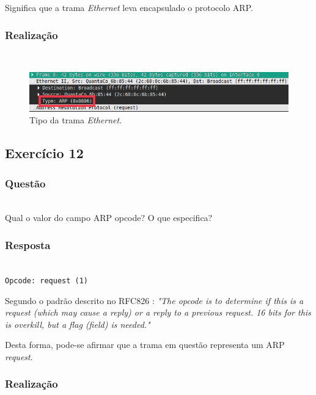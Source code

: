 \documentclass{llncs}
\begin{document}
Significa que a trama \textit{Ethernet} leva encapsulado o protocolo ARP.

\subsubsection{Realização}\rule[-10pt]{0pt}{10pt}\\

\begin{figure}
  \begin{center}
	  \includegraphics[scale=0.6]{./imagens/arp_request_type.png} 
  \end{center}
	\caption{Tipo da trama \textit{Ethernet}.}
  \label{fig:arp_request_type}
\end{figure} 


\clearpage
\subsection{Exercício 12}
\subsubsection{Questão}\rule[-10pt]{0pt}{10pt}\\

Qual o valor do campo ARP opcode? O que especifica?

\subsubsection{Resposta}\rule[-10pt]{0pt}{10pt}\\

\texttt{Opcode: request (1)}

Segundo o padrão descrito no RFC826 \cite{RFC0826}:
	\emph{"The opcode is to determine if this is a request (which may cause a reply) or a reply to a previous request.  16 bits for this is overkill, but a flag (field) is needed."}

Desta forma, pode-se afirmar que a trama em questão representa um ARP \textit{request}.

\subsubsection{Realização}\rule[-10pt]{0pt}{10pt}\\
\end{document}
